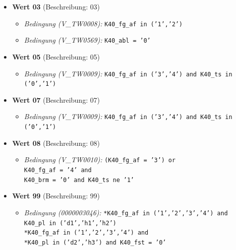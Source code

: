 \documentclass[12pt, a4paper, oneside]{book}
\begin{document}
\begin{itemize}
    \begin{itemize}
        \item \textit{Bedingung (V\_TW0008):} \texttt{K40\_fg\_af in ('1','2')}
        \item \textit{Bedingung (V\_TW0569):} \texttt{K40\_abl = '0'}
    \end{itemize}
    \item \textbf{Wert 03} (Beschreibung: 03)
    \begin{itemize}
        \item \textit{Bedingung (V\_TW0008):} \texttt{K40\_fg\_af in ('1','2')}
        \item \textit{Bedingung (V\_TW0569):} \texttt{K40\_abl = '0'}
    \end{itemize}
    \item \textbf{Wert 05} (Beschreibung: 05)
    \begin{itemize}
        \item \textit{Bedingung (V\_TW0009):} \texttt{K40\_fg\_af in ('3','4') and K40\_ts in ('0','1')}
    \end{itemize}
    \item \textbf{Wert 07} (Beschreibung: 07)
    \begin{itemize}
        \item \textit{Bedingung (V\_TW0009):} \texttt{K40\_fg\_af in ('3','4') and K40\_ts in ('0','1')}
    \end{itemize}
    \item \textbf{Wert 08} (Beschreibung: 08)
    \begin{itemize}
        \item \textit{Bedingung (V\_TW0010):} \texttt{(K40\_fg\_af = '3') or \\ 
        K40\_fg\_af = '4' and \\ 
        K40\_brm = '0' and K40\_ts ne '1'}
    \end{itemize}
    \item \textbf{Wert 99} (Beschreibung: 99)
    \begin{itemize}
        \item \textit{Bedingung (0000003046):} \texttt{*K40\_fg\_af in ('1','2','3','4') and \\ 
        K40\_pl in ('d1','h1','h2') \\ 
        *K40\_fg\_af in ('1','2','3','4') and \\ 
        *K40\_pl in ('d2','h3') and K40\_fst = '0'}
    \end{itemize}
\end{itemize}
\end{document}
